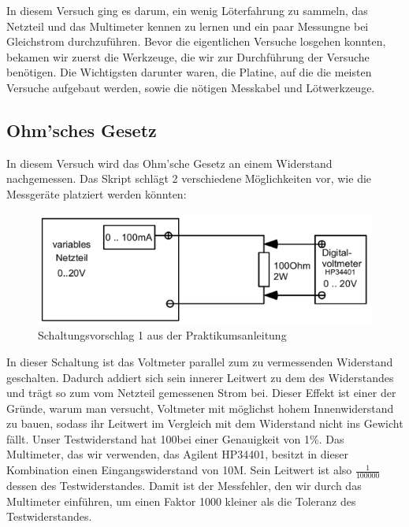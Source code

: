 
\setcounter{section}{1}
In diesem Versuch ging es darum, ein wenig Löterfahrung zu sammeln, das Netzteil und das Multimeter kennen zu lernen und ein paar Messungne bei Gleichstrom durchzuführen.
Bevor die eigentlichen Versuche losgehen konnten, bekamen wir zuerst die Werkzeuge, die wir zur Durchführung der Versuche benötigen. Die Wichtigsten darunter waren, die Platine, auf die die meisten Versuche aufgebaut werden, sowie die nötigen Messkabel und Lötwerkzeuge.

\subsection{Ohm'sches Gesetz}
In diesem Versuch wird das Ohm'sche Gesetz an einem Widerstand nachgemessen.
Das Skript schlägt 2 verschiedene Möglichkeiten vor, wie die Messgeräte platziert werden könnten:
\begin{figure}[H] %
	\centering
	\includegraphics[width=\linewidth]{versuch1/v1_1_Schaltungsvorschlag1}
	\caption{Schaltungsvorschlag 1 aus der Praktikumsanleitung}
\end{figure}
In dieser Schaltung ist das Voltmeter parallel zum zu vermessenden Widerstand geschalten. Dadurch addiert sich sein innerer Leitwert zu dem des Widerstandes und trägt so zum vom Netzteil gemessenen Strom bei. Dieser Effekt ist einer der Gründe, warum man versucht, Voltmeter mit möglichst hohem Innenwiderstand zu bauen, sodass ihr Leitwert im Vergleich mit dem Widerstand nicht ins Gewicht fällt.
Unser Testwiderstand hat 100\Omega bei einer Genauigkeit von 1\%.
Das Multimeter, das wir verwenden, das Agilent HP34401, besitzt in dieser Kombination einen Eingangswiderstand von 10M\Omega \cite{hp34401}. Sein Leitwert ist also $\frac{1}{100000}$ dessen des Testwiderstandes. Damit ist der Messfehler, den wir durch das Multimeter einführen, um einen Faktor 1000 kleiner als die Toleranz des Testwiderstandes.

